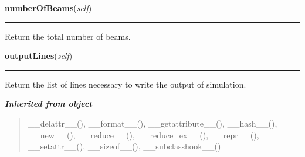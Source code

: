     \label{theia:tree:beamtree:BeamTree:numberOfBeams}

    \vspace{0.5ex}

\hspace{.8\funcindent}\begin{boxedminipage}{\funcwidth}

    \raggedright \textbf{numberOfBeams}(\textit{self})

    \vspace{-1.5ex}

    \rule{\textwidth}{0.5\fboxrule}
\setlength{\parskip}{2ex}
    Return the total number of beams.

\setlength{\parskip}{1ex}
    \end{boxedminipage}

    \label{theia:tree:beamtree:BeamTree:outputLines}

    \vspace{0.5ex}

\hspace{.8\funcindent}\begin{boxedminipage}{\funcwidth}

    \raggedright \textbf{outputLines}(\textit{self})

    \vspace{-1.5ex}

    \rule{\textwidth}{0.5\fboxrule}
\setlength{\parskip}{2ex}
    Return the list of lines necessary to write the output of simulation.

\setlength{\parskip}{1ex}
    \end{boxedminipage}


\large{\textbf{\textit{Inherited from object}}}

\begin{quote}
\_\_delattr\_\_(), \_\_format\_\_(), \_\_getattribute\_\_(), \_\_hash\_\_(), \_\_new\_\_(), \_\_reduce\_\_(), \_\_reduce\_ex\_\_(), \_\_repr\_\_(), \_\_setattr\_\_(), \_\_sizeof\_\_(), \_\_subclasshook\_\_()
\end{quote}


